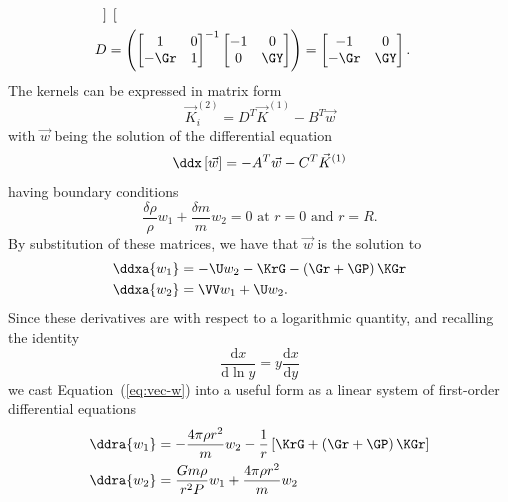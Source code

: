 \begin{description}
\begin{align}
\begin{bmatrix}
  \end{bmatrix} \\
D &= \left(
  \begin{bmatrix}
    1 & 0 \\
    -\Gr & 1
  \end{bmatrix}^{-1}
  \begin{bmatrix}
    -1 & 0 \\
    0 & \GY
  \end{bmatrix} \right)
= \begin{bmatrix}
    -1 & 0 \\
    -\Gr & \GY
  \end{bmatrix}.
\end{align}
The kernels can be expressed in matrix form
\begin{equation} \label{eq:vec-k}
    \vec K^{(2)}_i = D^T \vec K^{(1)} - B^T \vec w
\end{equation}
with $\vec w$ being the solution of the differential equation %
\begin{equation} \label{eq:vec-w}
    \ddx \left[ \vec w \right] = -A^T \vec w - C^T \vec K^{(1)}
\end{equation}
having boundary conditions %
\begin{equation} \label{eq:bvs2}
    \frac{\delta \rho}{\rho} w_1 + \frac{\delta m}{m} w_2 = 0 \text{ at } r=0 \text{ and } r=R.
\end{equation}
By substitution of these matrices, we have that $\vec w$ is the solution to 
\begin{align}
    \ddxa{w_1} &= -\U w_2 - \KrG - \left( \Gr + \GP \right) \KGr \\
    \ddxa{w_2} &= \VV w_1 + \U w_2.
\end{align}
Since these derivatives are with respect to a logarithmic quantity, and recalling the identity
\begin{equation}
    \frac{\text{d}x}{\text{d}\ln y} = y\frac{\text{d}x}{\text{d}y} %
\end{equation}
we cast Equation~(\ref{eq:vec-w}) into a useful form as a linear system of first-order differential equations 
\begin{align}
    \ddra{w_1} &= -\frac{4\pi\rho r^2}{m} w_2 - \frac{1}{r} \left[ \KrG + \left( \Gr + \GP \right) \KGr \right] \\
    \ddra{w_2} &= \frac{G m \rho}{r^2P} w_1 + \frac{4\pi\rho r^2}{m} w_2
\end{align}

\end{description}
